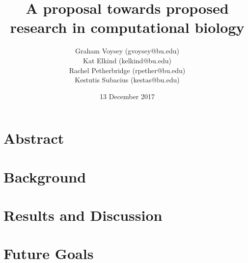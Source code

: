 \documentclass[10pt]{article}
\begin{document}
\title{A proposal towards proposed research in computational biology}
\date{13 December 2017}
\author{Graham Voysey (gvoysey@bu.edu)\\
	    Kat Elkind (kelkind@bu.edu)\\
	    Rachel Petherbridge (rpether@bu.edu)\\
	    Kestutis Subacius (kestas@bu.edu)}
\maketitle
\section{Abstract}
\section{Background}
\section{Results and Discussion}

\section{Future Goals}
\end{document}
